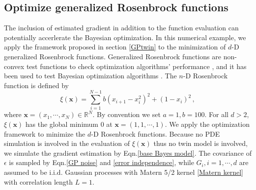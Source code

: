 \documentclass[a4paper,onecolumn]{article}
\theoremstyle{remark}
\begin{document}
\subsection{Optimize generalized Rosenbrock functions}
The inclusion of estimated gradient in addition to the function evaluation  
can potentially accerlerate the Bayesian optimization. 
In this numerical example, we apply the framework proposed in section \ref{GPtwin} to
the minimization of $d$-D generalized Rosenbrock functions.
Generalized Rosenbrock functions are non-convex test functions to 
check optimization algorithms' performance \cite{Rosenbrock}, and it has been used to test
Bayesian optimization algorithms \cite{RemiRosenbrock}.
The $n$-D Rosenbrock function is defined by
\begin{equation}
    \xi(\mathbf{x}) = \sum_{i=1}^{N-1} b (x_{i+1} - x_i^2)^2 + (1- x_i)^2\,,
\end{equation}
where $\mathbf{x} = (x_1, \cdots, x_N) \in \mathbb{R}^N$. By convention we set $a=1, b=100$.
For all $d>2$,
$\xi(\mathbf{x})$ has the global minimum $0$ at $\mathbf{x}=(1, 1, \cdots, 1)$.
We apply the optimization framework to minimize the $d$-D Rosenbrock functions. Because no PDE 
simulation is involved in the evaluation of $\xi(\mathbf{x})$ thus no twin model is involved,
we simulate the gradient estimation by 
Eqn.\eqref{base Bayes model}. The covariance of $\epsilon$ is sampled by Eqn.\eqref{GP noise} and 
\eqref{error independence}, while $G_i, i=1,\cdots,d$ are assumed to be i.i.d. Gaussian processes 
with Matern 5/2 kernel \eqref{Matern kernel} with correlation length $L=1$.\\
\end{document}
